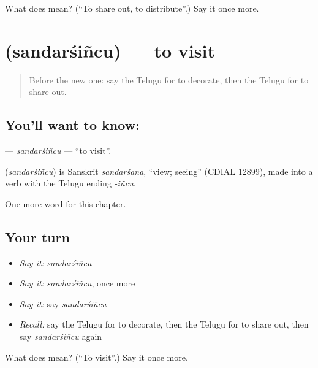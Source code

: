 \begin{tcolorbox}[breakable,colback=teal!4,colframe=teal!35!black,title={Before you move on}]
What does  mean? (\textquotedblleft{}To share out, to distribute\textquotedblright{}.) Say it once more.
\end{tcolorbox}
\section[\texorpdfstring{\te{సందర్శించు} (sandarśiñcu)}{సందర్శించు (sandarśiñcu)}]{ (sandarśiñcu) — to visit}

\label{lesson:TE-C282-sandarsincu}



\begin{quote}
Before the new one: say the Telugu for to decorate, then the Telugu for to share out.
\end{quote}

\subsection*{You'll want to know: }
\textbf{} — \emph{sandarśiñcu} — \textquotedblleft{}to visit\textquotedblright{}.

\begin{cousinweb}
\textbf{} (\emph{sandarśiñcu}) is Sanskrit \emph{sandarśana}, \textquotedblleft{}view; seeing\textquotedblright{} (CDIAL 12899), made into a verb with the Telugu ending \emph{-iñcu}.
\end{cousinweb}

\begin{grammarlens}[title={What you've built}]
One more word for this chapter.
\end{grammarlens}

\subsection*{Your turn}
\begin{itemize}
\raggedright
  \item \emph{Say it:} \emph{sandarśiñcu}
  \item \emph{Say it:} \emph{sandarśiñcu}, once more
  \item \emph{Say it:} say \emph{sandarśiñcu}
  \item \emph{Recall:} say the Telugu for to decorate, then the Telugu for to share out, then say \emph{sandarśiñcu} again
\end{itemize}

\begin{tcolorbox}[breakable,colback=teal!4,colframe=teal!35!black,title={Before you move on}]
What does  mean? (\textquotedblleft{}To visit\textquotedblright{}.) Say it once more.
\end{tcolorbox}
